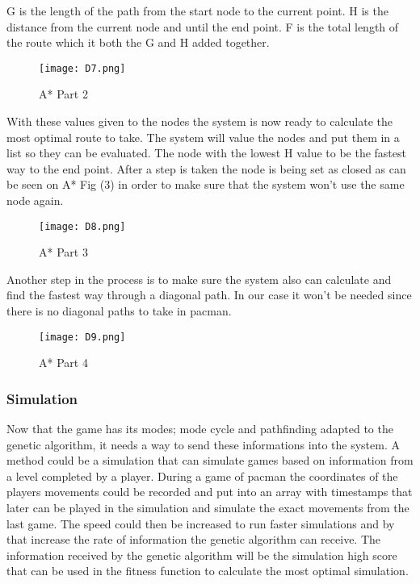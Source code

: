 G is the length of the path from the start node to the current point.
H is the distance from the current node and until the end point.
F is the total length of the route which it both the G and H added together.


\begin{figure}[!htbp]
\centering
\texttt{[image: D7.png]}
\caption{  A* Part 2 }
\label{fig:A2}
\end{figure}


With these values given to the nodes the system is now ready to calculate the most optimal route to take. The system will value the nodes and put them in a list so they can be evaluated. The node with the lowest H value to be the fastest way to the end point. After a step is taken the node is being set as closed as can be seen on A* Fig (3) in order to make sure that the system won’t use the same node again.


\begin{figure}[!htbp]
\centering
\texttt{[image: D8.png]}
\caption{  A* Part 3 }
\label{fig:A3}
\end{figure}


Another step in the process is to make sure the system also can calculate and find the fastest way through a diagonal path. In our case it won’t be needed since there is no diagonal paths to take in pacman.


\begin{figure}[!htbp]
\centering
\texttt{[image: D9.png]}
\caption{  A* Part 4 }
\label{fig:A4}
\end{figure}


\subsubsection{Simulation}

Now that the game has its modes; mode cycle and pathfinding adapted to the genetic algorithm, it needs a way to send these informations into the system. A method could be a simulation that can simulate games based on information from a level completed by a player. During a game of pacman the coordinates of the players movements could be recorded and put into an array with timestamps that later can be played in the simulation and simulate the exact movements from the last game. The speed could then be increased to run faster simulations and by that increase the rate of information the genetic algorithm can receive. The information received by the genetic algorithm will be the simulation high score that can be used in the fitness function to calculate the most optimal simulation.


